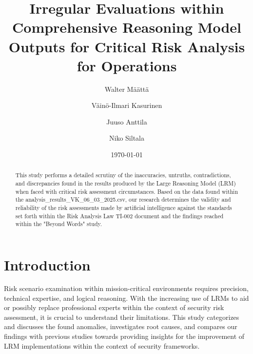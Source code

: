 \documentclass[sigconf]{acmart}
\begin{document}
\title{Irregular Evaluations within Comprehensive Reasoning Model Outputs for Critical Risk Analysis for Operations }

\author{Walter Määttä}

\author{Väinö-Ilmari Kasurinen}

\author{Juuso Anttila}

\author{Niko Siltala}

\date{\today}

\begin{abstract}
  This study performs a detailed scrutiny of the inaccuracies, untruths, contradictions, and discrepancies found in the results produced by the Large Reasoning Model (LRM) when faced with critical risk assessment circumstances. Based on the data found within the analysis\_results\_VK\_06\_03\_2025.csv, our research determines the validity and reliability of the risk assessments made by artificial intelligence against the standards set forth within the Risk Analysis Law TI-002 document and the findings reached within the "Beyond Words" study. 
\end{abstract}


\maketitle

\section{Introduction}
Risk scenario examination within mission-critical environments requires precision, technical expertise, and logical reasoning. With the increasing use of LRMs to aid or possibly replace professional experts within the context of security risk assessment, it is crucial to understand their limitations. This study categorizes and discusses the found anomalies, investigates root causes, and compares our findings with previous studies towards providing insights for the improvement of LRM implementations within the context of security frameworks.
\end{document}
